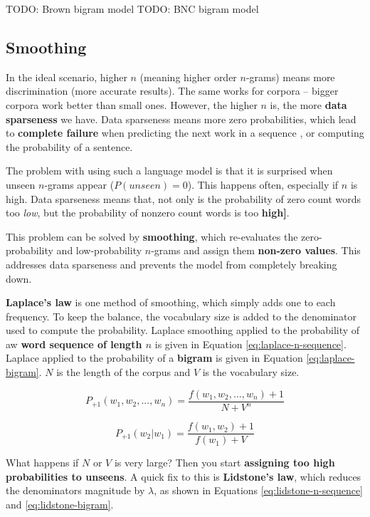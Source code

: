 \documentclass{article}
\begin{document}
TODO: Brown bigram model
TODO: BNC bigram model

\subsection{Smoothing}

In the ideal scenario, higher $n$ (meaning higher order $n$-grams) means more discrimination (more accurate results). The same works for corpora -- bigger corpora work better than small ones. However, the higher $n$ is, the more \textbf{data sparseness} we have. Data sparseness means more zero probabilities, which lead to \textbf{complete failure} when predicting the next work in a sequence , or computing the probability of a sentence.

The problem with using such a language model is that it is surprised when unseen $n$-grams appear ($P(unseen) = 0$). This happens often, especially if $n$ is high. Data sparseness means that, not only is the probability of zero count words too \textit{low}, but the probability of nonzero count words is too \textbf{high]}.

This problem can be solved by \textbf{smoothing}, which re-evaluates the zero-probability and low-probability $n$-grams and assign them \textbf{non-zero values}. This addresses data sparseness and prevents the model from completely breaking down.

\textbf{Laplace's law} is one method of smoothing, which simply adds one to each frequency. To keep the balance, the vocabulary size is added to the denominator used to compute the probability. Laplace smoothing applied to the probability of aw \textbf{word sequence of length $n$} is given in Equation \ref{eq:laplace-n-sequence}. Laplace applied to the probability of a \textbf{bigram} is given in Equation \ref{eq:laplace-bigram}. $N$ is the length of the corpus and $V$ is the vocabulary size.

\begin{equation}
	P_{+1}(w_1,w_2,...,w_n) = \frac{f(w_1,w_2,...,w_n) + 1}{N + V^{n}}
	\label{eq:laplace-n-sequence}
\end{equation}

\begin{equation}
	P_{+1}(w_2|w_1) = \frac{f(w_1,w_2) + 1}{f(w_1) + V}
	\label{eq:laplace-bigram}
\end{equation}

What happens if $N$ or $V$ is very large? Then you start \textbf{assigning too high probabilities to unseens}. A quick fix to this is \textbf{Lidstone's law}, which reduces the denominators magnitude by $\lambda$, as shown in Equations \ref{eq:lidstone-n-sequence} and \ref{eq:lidstone-bigram}.
\end{document}

